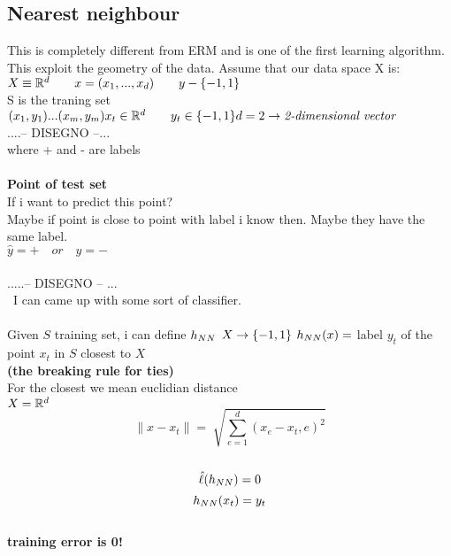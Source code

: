 \documentclass[../main.tex]{subfiles}
\begin{document}
\subsection{Nearest neighbour}
This is completely different from ERM and is one of the first learning
algorithm. This exploit the geometry of the data.
Assume that our data space X is:
\\
$ X \equiv \mathbb{R}^d \qquad x = (x_1, ..., x_d) \qquad y-\{-1,1\}
$
\\
S is the traning set $(x_1,y_1)...(x_m,y_m) \\ x_t \in \mathbb{R}^d \qquad y_t \in \{-1,1\} \\\\
d = 2 \rightarrow \textit{2-dimensional vector}\\
$\\
....-- DISEGNO --...
\\
where + and - are labels
\\\\
\textbf{Point of test set}
\\
If i want to predict this point?
\\
Maybe if point is close to point with label i know then. Maybe they have the same label.
\\
$\hat{y} = + \quad or \quad  \hat{y} = - $
\\\\
.....-- DISEGNO -- ...
\\\
I can came up with some sort of classifier.
\\\\
Given $S$ training set, i can define $h_{NN}$  $X \rightarrow \{-1,1\}\\
$
$h_{NN}(x) = $ label $y_t$ of the point $x_t$ in $S$ closest to $X$\\
\textbf{(the breaking rule for ties)}
\\
For the closest we mean euclidian distance
\\
$ X = \mathbb{R}^d
\\
$
$$ 
\| x - x_t \| = \sqrt[] {\sum_{e=1}^{d} (x_e-x_t,e)^2}
$$\\
$$
\hat{\ell}(h_{NN}) = 0  
$$
$$
h_{NN} (x_t) = y_t
$$
\\
\textbf{training error is 0!}
\end{document}
